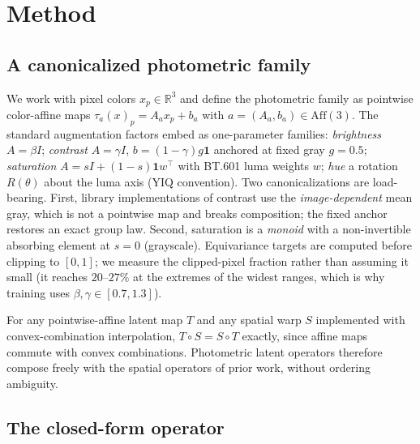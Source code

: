 \documentclass[11pt]{article}
\begin{document}
\section{Method}
\label{sec:method}

\subsection{A canonicalized photometric family}
\label{sec:family}

We work with pixel colors $x_p \in \mathbb{R}^3$ and define the photometric
family as pointwise color-affine maps $\tau_a(x)_p = A_a x_p + b_a$ with
$a = (A_a, b_a) \in \mathrm{Aff}(3)$. The standard augmentation factors embed
as one-parameter families: \emph{brightness} $A=\beta I$; \emph{contrast}
$A=\gamma I$, $b=(1-\gamma)g\mathbf{1}$ anchored at fixed gray $g=0.5$;
\emph{saturation} $A = sI + (1-s)\mathbf{1}w^\top$ with BT.601 luma weights
$w$; \emph{hue} a rotation $R(\theta)$ about the luma axis (YIQ convention).
Two canonicalizations are load-bearing. First, library implementations of
contrast use the \emph{image-dependent} mean gray, which is not a pointwise
map and breaks composition; the fixed anchor restores an exact group law.
Second, saturation is a \emph{monoid} with a non-invertible absorbing element
at $s{=}0$ (grayscale). Equivariance targets are computed before clipping to
$[0,1]$; we measure the clipped-pixel fraction rather than assuming it small
(it reaches $20$--$27\%$ at the extremes of the widest ranges, which is why
training uses $\beta,\gamma \in [0.7, 1.3]$).

For any pointwise-affine latent map $T$ and any spatial warp $S$ implemented
with convex-combination interpolation, $T \circ S = S \circ T$ exactly, since
affine maps commute with convex combinations. Photometric latent operators
therefore compose freely with the spatial operators of prior work, without
ordering ambiguity.

\subsection{The closed-form operator}
\label{sec:closedform}
\end{document}
